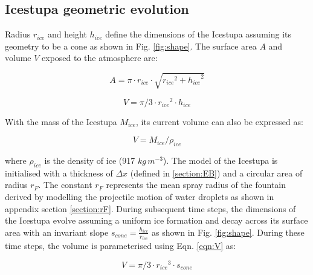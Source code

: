 \documentclass[utf8]{frontiersSCNS} %
\begin{document}
\subsection{Icestupa geometric evolution}

Radius $r_{ice}$ and height $h_{ice}$ define the dimensions of the Icestupa
assuming its geometry to be a cone as shown in Fig. \ref{fig:shape}. The
surface area $A$ and volume $V$ exposed to the atmosphere are:

\begin{equation}
    A = \pi \cdot r_{ice} \cdot \sqrt{{r_{ice}}^2 + {h_{ice}}^ 2}
    \label{eqn:A}
\end{equation}

\begin{equation}
    V = \pi/3 \cdot {r_{ice}}^2 \cdot h_{ice}
    \label{eqn:V}
\end{equation}

With the mass of the Icestupa $M_{ice}$, its current volume can also be
expressed as:

\begin{equation}
    V = M_{ice} / \rho_{ice}
    \label{eqn:V1}
\end{equation}

where $\rho_{ice}$ is the density of ice (917 $kg\, m^{-3}$). The model of the
Icestupa is initialised with a thickness of $\Delta x$ (defined in
\ref{section:EB}) and a circular area of radius $r_F$. The constant $r_F$
represents the mean spray radius of the fountain derived by modelling the
projectile motion of water droplets as shown in appendix section
\ref{section:rF}. During subsequent time steps, the dimensions of the Icestupa
evolve assuming a uniform ice formation and decay across its surface area with
an invariant slope $s_{cone} = \frac{h_{ice}}{r_{ice}}$ as shown in Fig.
\ref{fig:shape}. During these time steps, the volume is parameterised using
Eqn. \ref{eqn:V} as:

\begin{equation}
    V = \pi/3 \cdot {r_{ice}}^3 \cdot s_{cone}
    \label{eqn:V2}
\end{equation}
\end{document}
